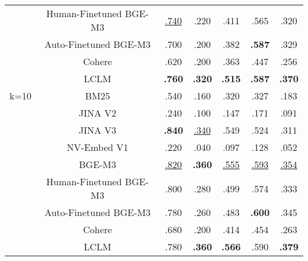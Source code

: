 \begin{table}[ht]
\begin{tabular}{@{}c|cccccc@{}}
      & Human-Finetuned BGE-M3 & \underline{.740}    & .220          & .411          & .565          & .320          \\
      & Auto-Finetuned BGE-M3  & .700          & .200          & .382          & \textbf{.587} & .329          \\
      & Cohere                 & .620          & .200          & .363          & .447          & .256          \\
      & LCLM                   & \textbf{.760} & \textbf{.320} & \textbf{.515} & \textbf{.587} & \textbf{.370} \\ \midrule
k=10  & BM25                   & .540          & .160          & .320          & .327          & .183          \\
      & JINA V2                & .240          & .100          & .147          & .171          & .091          \\
      & JINA V3                & \textbf{.840} & \underline{.340}    & .549          & .524          & .311          \\
      & NV-Embed V1            & .220          & .040          & .097          & .128          & .052          \\
      & BGE-M3                 & \underline{.820}    & \textbf{.360} & \underline{.555}    & \underline{.593}    & \underline{.354}    \\
      & Human-Finetuned BGE-M3 & .800          & .280          & .499          & .574          & .333          \\
      & Auto-Finetuned BGE-M3  & .780          & .260          & .483          & \textbf{.600} & .345          \\
      & Cohere                 & .680          & .200          & .414          & .454          & .263          \\
      & LCLM                   & .780          & \textbf{.360} & \textbf{.566} & .590          & \textbf{.379} \\ \bottomrule
\end{tabular}
\end{table}


